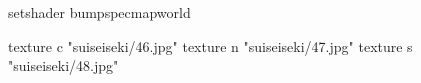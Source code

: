 setshader bumpspecmapworld

    texture c "suiseiseki/46.jpg"
    texture n "suiseiseki/47.jpg"
    texture s "suiseiseki/48.jpg"

